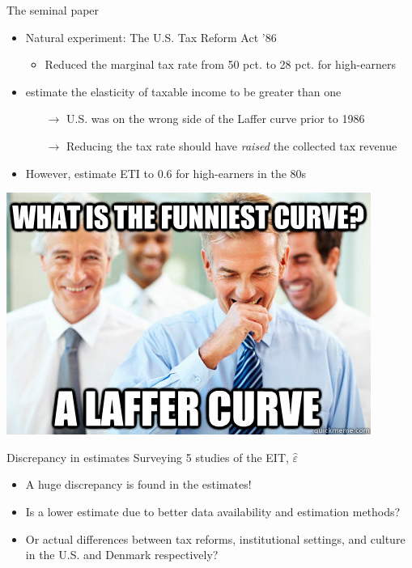 \documentclass[8pt]{beamer}
\begin{document}
\begin{frame}{The seminal paper}
  \begin{itemize}
    \item Natural experiment: The U.S. Tax Reform Act '86
    \begin{itemize}
      \item Reduced the marginal tax rate from 50 pct. to 28 pct. for high-earners
    \end{itemize}
    \item \citet{feldstein1995effect} estimate the elasticity of taxable income to be greater than one
    \begin{itemize}
      \item[$\rightarrow$] U.S. was on the wrong side of the Laffer curve prior to 1986
      \item[$\rightarrow$] Reducing the tax rate should have \textit{raised} the collected tax revenue
    \end{itemize}
    \item However, \citet{gruber2002elasticity} estimate ETI to 0.6 for high-earners in the 80s
  \end{itemize}
    \centering\includegraphics[width=0.8 \textwidth]{laffer}
\end{frame}

\begin{frame}{Discrepancy in estimates}
  Surveying 5 studies of the EIT, $\hat{\varepsilon}$
  \begin{itemize}
    \item A huge discrepancy is found in the estimates!
    \item Is a lower estimate due to better data availability and estimation methods?
    \item Or actual differences between tax reforms, institutional settings, and culture in the U.S. and Denmark respectively?
  \end{itemize}
    \begin{table}[h]
      \centering
      \footnotesize
        
    \end{table}
\end{frame}
\end{document}
